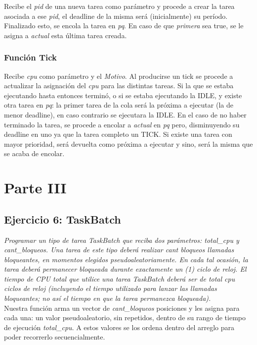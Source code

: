 \documentclass[a4paper]{article}
\begin{document}
Recibe el \emph{pid} de una nueva tarea como par\'ametro y procede a crear la tarea asociada a ese \emph{pid}, el deadline de la misma ser\'a (inicialmente) su per\'iodo. Finalizado esto, se encola la tarea en \emph{pq}. En caso de que \emph{primera} sea true, se le asigna a \emph{actual} esta última tarea creada.

\subsubsection*{Funci\'on Tick}	

Recibe \emph{cpu} como par\'ametro y el \emph{Motivo}. Al producirse un tick se procede a actualizar la asignación del \emph{cpu} para las distintas tareas.  Si la que se estaba ejecutando hasta entonces terminó, o si se estaba ejecutando la IDLE, y existe otra tarea en \emph{pq}: la primer tarea de la cola será la próxima a ejecutar (la de menor deadline), en caso contrario se ejecutara la IDLE. En el caso de no haber terminado la tarea, se procede a encolar a \emph{actual} en \emph{pq} pero, disminuyendo su deadline en uno ya que la tarea completo un TICK. Si existe una tarea con mayor prioridad, ser\'a devuelta como próxima a ejecutar y sino, ser\'a la misma que se acaba de encolar.  




\newpage
\section{Parte III}


 \subsection{Ejercicio 6: TaskBatch}
\textit{Programar un tipo de tarea TaskBatch que reciba dos par\'ametros: total_cpu y cant_bloqueos. Una tarea de este tipo deber\'a realizar cant bloqueos llamadas bloqueantes, en momentos elegidos pseudoaleatoriamente. En cada tal ocasi\'on, la tarea deber\'a permanecer bloqueada durante exactamente un (1) ciclo de reloj. El tiempo de CPU total que utilice una tarea TaskBatch deber\'a ser de total cpu ciclos de reloj (incluyendo el tiempo utilizado para lanzar las llamadas bloqueantes; no as\'i el tiempo en que la tarea permanezca bloqueada).}\\

Nuestra funci\'on arma un vector de \emph{cant_bloqueos} posiciones y les asigna para cada una: un valor pseudoaleatorio, sin repetidos, dentro de su rango de tiempo de ejecuci\'on \emph{total_cpu}. A estos valores se los ordena dentro del arreglo para poder recorrerlo secuencialmente.\\
\end{document}
